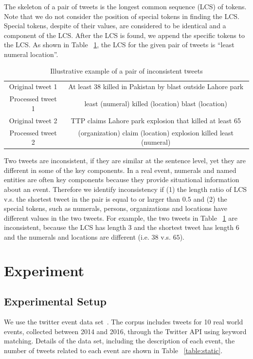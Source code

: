 \documentclass[envcountsame]{llncs}
\begin{document}
The skeleton of a pair of tweets is the longest common sequence (LCS) of tokens. Note that we do not consider the position of special tokens in finding the LCS. Special tokens, despite of their values, are considered to be identical and a component of the LCS. After the LCS is found, we append the specific tokens to the LCS. As shown in Table ~\ref{tab:example}, the LCS for the given pair of tweets is ``least numeral location''.

\begin{table}[ht]
\caption{Illustrative example of a pair of inconsistent tweets}\label{tab:example}
\begin{tabular}{|c|c|}
\hline
Original tweet 1 & At least 38 killed in Pakistan by blast outside Lahore park \\
Processed tweet 1  & least (numeral) killed  (location) blast  (location)\\\hline
Original tweet 2 & TTP claims Lahore park explosion that killed at least 65 \\
Processed tweet 2& (organization) claim (location) explosion killed least (numeral)\\\hline
\end{tabular}
\end{table}

Two tweets are inconsistent, if they are similar at the sentence level, yet they are different in some of the key components. In a real event, numerals and named entities are often key components because they provide situational information about an event. Therefore we identify inconsistency if (1) the length ratio of LCS v.s. the shortest tweet in the pair is equal to or larger than $0.5$ and (2) the special tokens, such as numerals, persons, organizations and locations have different values in the two tweets. For example, the two tweets in Table ~\ref{tab:example} are inconsistent, because the LCS has length $3$ and the shortest tweet has length $6$ and the numerals and locations are different (i.e. $38$ v.s. $65$).

\section{Experiment}\label{sec:experiment}
\subsection{Experimental Setup}
We use the twitter event data set~\cite{ZubiagaTwitterDatasets}. The corpus includes tweets for 10 real world events, collected between 2014 and 2016, through the Twitter API using keyword matching. Details of the data set, including the description of each event, the number of tweets related to each event are shown in Table ~\ref{table:static}.
\end{document}
